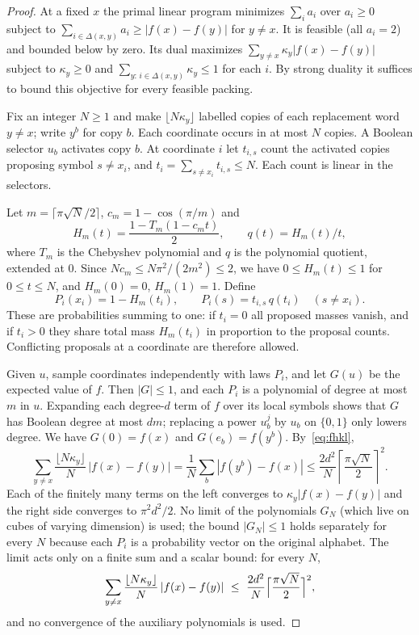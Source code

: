 \documentclass[11pt]{article}
\numberwithin{equation}{section}
\theoremstyle{plain}
\theoremstyle{remark}
\begin{document}
\begin{proof}
At a fixed $x$ the primal linear program minimizes $\sum_ia_i$ over $a_i\ge0$ subject to $\sum_{i\in\Delta(x,y)}a_i\ge|f(x)-f(y)|$ for $y\ne x$. It is feasible (all $a_i=2$) and bounded below by zero. Its dual maximizes $\sum_{y\ne x}\kappa_y|f(x)-f(y)|$ subject to $\kappa_y\ge0$ and $\sum_{y:\,i\in\Delta(x,y)}\kappa_y\le1$ for each $i$. By strong duality it suffices to bound this objective for every feasible packing.

Fix an integer $N\ge1$ and make $\lfloor N\kappa_y\rfloor$ labelled copies of each replacement word $y\ne x$; write $y^b$ for copy $b$. Each coordinate occurs in at most $N$ copies. A Boolean selector $u_b$ activates copy $b$. At coordinate $i$ let $t_{i,s}$ count the activated copies proposing symbol $s\ne x_i$, and $t_i=\sum_{s\ne x_i}t_{i,s}\le N$. Each count is linear in the selectors.

Let $m=\lceil\pi\sqrt N/2\rceil$, $c_m=1-\cos(\pi/m)$ and
\[
H_m(t)=\frac{1-T_m(1-c_m t)}2,\qquad q(t)=H_m(t)/t,
\]
where $T_m$ is the Chebyshev polynomial and $q$ is the polynomial quotient, extended at $0$. Since $Nc_m\le N\pi^2/(2m^2)\le2$, we have $0\le H_m(t)\le1$ for $0\le t\le N$, and $H_m(0)=0$, $H_m(1)=1$. Define
\[
P_i(x_i)=1-H_m(t_i),\qquad P_i(s)=t_{i,s}\,q(t_i)\quad(s\ne x_i).
\]
These are probabilities summing to one: if $t_i=0$ all proposed masses vanish, and if $t_i>0$ they share total mass $H_m(t_i)$ in proportion to the proposal counts. Conflicting proposals at a coordinate are therefore allowed.

Given $u$, sample coordinates independently with laws $P_i$, and let $G(u)$ be the expected value of $f$. Then $|G|\le1$, and each $P_i$ is a polynomial of degree at most $m$ in $u$. Expanding each degree-$d$ term of $f$ over its local symbols shows that $G$ has Boolean degree at most $dm$; replacing a power $u_b^j$ by $u_b$ on $\{0,1\}$ only lowers degree. We have $G(0)=f(x)$ and $G(e_b)=f(y^b)$. By~\eqref{eq:fhkl},
\[
\sum_{y\ne x}\frac{\lfloor N\kappa_y\rfloor}{N}\,|f(x)-f(y)|
=\frac1N\sum_b|f(y^b)-f(x)|
\le \frac{2d^2}{N}\left\lceil\frac{\pi\sqrt N}{2}\right\rceil^2.
\]
Each of the finitely many terms on the left converges to $\kappa_y|f(x)-f(y)|$ and the right side converges to $\pi^2d^2/2$. No limit of the polynomials $G_N$ (which live on cubes of varying dimension) is used; the bound $|G_N|\le1$ holds separately for every $N$ because each $P_i$ is a probability vector on the original alphabet.
The limit acts only on a finite sum and a scalar bound: for every $N$,
\[
\sum_{y\ne x}\frac{\lfloor N\kappa_y\rfloor}{N}\,|f(x)-f(y)|\ \le\ \frac{2d^2}{N}\Bigl\lceil\frac{\pi\sqrt N}{2}\Bigr\rceil^2,
\]
and no convergence of the auxiliary polynomials is used.
\end{proof}
\end{document}
